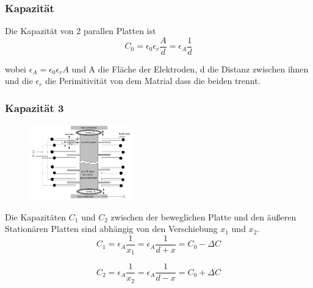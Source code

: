 \documentclass[10pt,a4paper,oneside]{beamer}
\begin{document}
\begin{frame}
	\frametitle{Kapazität}
	Die Kapazität von 2 parallen Platten ist \cite{AM08}
	\begin{equation}
		C_{0} = \epsilon_{0} \epsilon_{r} \frac{A}{d} = \epsilon_{A} \frac{1}{d}
	\end{equation}
	
	wobei $\epsilon_{A} = \epsilon_{0} \epsilon_{r} A$ und A die Fläche der Elektroden, d die Distanz zwischen ihnen und die $\epsilon_{r}$ die Perimitivität von dem Matrial dass die beiden trennt.

\end{frame}



\begin{frame}
	\frametitle{Kapazität 3}

\begin{figure}
\includegraphics[width=0.4\textwidth]{images/acceleromter_structure.png}
\end{figure}
Die Kapazitäten $C_{1}$ und $C_{2}$ zwischen der beweglichen Platte und den äußeren Stationären Platten sind abhängig von den Verschiebung $x_{1}$ und $x_{2}$.
	\begin{equation}
	C_{1} = \epsilon_{A} \frac{1}{x_{1}} = \epsilon_{A} \frac{1}{d+x} = C_{0} - \Delta C
	\end{equation}
	
	\begin{equation}
	C_{2} = \epsilon_{A} \frac{1}{x_{2}} = \epsilon_{A} \frac{1}{d-x} = C_{0} + \Delta C
	\end{equation}
	
\end{frame}
\end{document}
